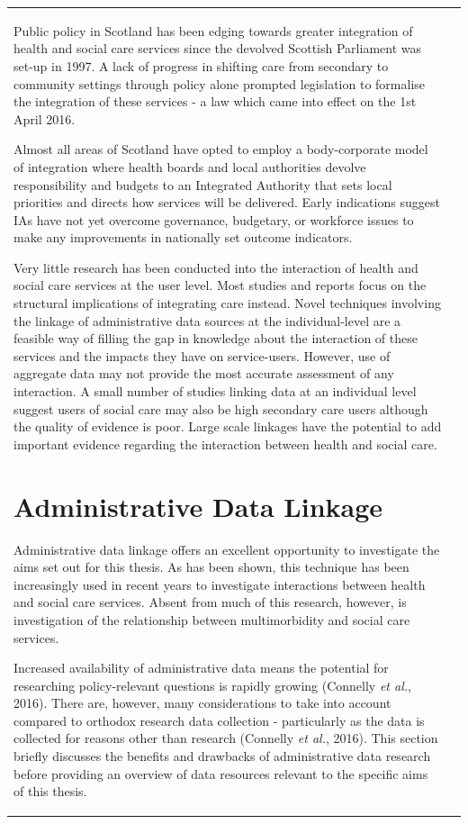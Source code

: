 \documentclass[12pt,a4paper,oneside,table]{report}
\begin{document}
\begin{tabular}[t]{ll}
Public policy in Scotland has been edging towards greater integration of
health and social care services since the devolved Scottish Parliament
was set-up in 1997. A lack of progress in shifting care from secondary
to community settings through policy alone prompted legislation to
formalise the integration of these services - a law which came into
effect on the 1st April 2016.

Almost all areas of Scotland have opted to employ a body-corporate model
of integration where health boards and local authorities devolve
responsibility and budgets to an Integrated Authority that sets local
priorities and directs how services will be delivered. Early indications
suggest IAs have not yet overcome governance, budgetary, or workforce
issues to make any improvements in nationally set outcome indicators.

Very little research has been conducted into the interaction of health
and social care services at the user level. Most studies and reports
focus on the structural implications of integrating care instead. Novel
techniques involving the linkage of administrative data sources at the
individual-level are a feasible way of filling the gap in knowledge
about the interaction of these services and the impacts they have on
service-users. However, use of aggregate data may not provide the most
accurate assessment of any interaction. A small number of studies
linking data at an individual level suggest users of social care may
also be high secondary care users although the quality of evidence is
poor. Large scale linkages have the potential to add important evidence
regarding the interaction between health and social care.

\newpage
\section{Administrative Data Linkage}\label{sec:data-linkage}

Administrative data linkage offers an excellent opportunity to
investigate the aims set out for this thesis. As has been shown, this
technique has been increasingly used in recent years to investigate
interactions between health and social care services. Absent from much
of this research, however, is investigation of the relationship between
multimorbidity and social care services.

Increased availability of administrative data means the potential for
researching policy-relevant questions is rapidly growing (Connelly
\emph{et al.}, 2016). There are, however, many considerations to take
into account compared to orthodox research data collection -
particularly as the data is collected for reasons other than research
(Connelly \emph{et al.}, 2016). This section briefly discusses the
benefits and drawbacks of administrative data research before providing
an overview of data resources relevant to the specific aims of this
thesis.


\end{tabular}
\end{document}
